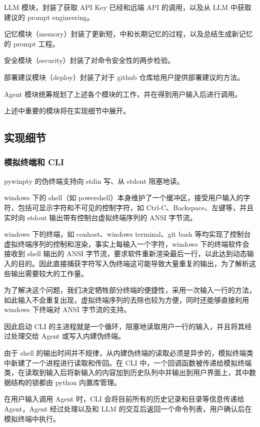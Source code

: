 \documentclass{article}
\theoremstyle{plain}
\theoremstyle{definition}
\theoremstyle{remark}
\begin{document}
LLM 模块，封装了获取 API Key 已经和远端 API 的调用，以及从 LLM 中获取建议的 prompt engineering。

记忆模块（memory）封装了更新短，中和长期记忆的过程，以及总结生成新记忆的 prompt 工程。

安全模块（security）封装了对命令安全性的两步检验。

部署建议模块（deploy）封装了对于 github 仓库给用户提供部署建议的方法。

Agent 模块统筹规划了上述各个模块的工作，并在得到用户输入后进行调用。

上述中重要的模块将在实现细节中展开。

\subsection{实现细节}

\subsubsection{模拟终端和 CLI}

pywinpty 的伪终端支持向 stdin 写、从 stdout 阻塞地读。

windows 下的 shell（如 powershell）本身维护了一个缓冲区，接受用户输入的字符，包括可显示字符和不可见的控制字符，如 Ctrl-C、Backspace、左键等，并且实时向 stdout 输出带有控制台虚拟终端序列的 ANSI 字节流。

windows 下的终端，如 conhost、windows terminal、git bash 等均实现了控制台虚拟终端序列的控制和渲染，事实上每输入一个字符，windows 下的终端软件会接收到 shell 输出的 ANSI 字节流，要求软件重新渲染最后一行，以此达到动态输入的目的。因此直接捕获字符写入伪终端这可能导致大量重复的输出，为了解析这些输出需要较大的工作量。

为了解决这个问题，我们决定牺牲部分终端的便捷性，采用一次输入一行的方法，如此输入不会重复出现，虚拟终端序列的去除也较为方便，同时还能够直接利用 windows 下终端对 ANSI 字节流的支持。

因此启动 CLI 的主进程就是一个循环，阻塞地读取用户一行的输入，并且将其经过处理交给 Agent 或写入内建伪终端。

由于 shell 的输出时间并不规律，从内建伪终端的读取必须是异步的，模拟终端类中新建了一个进程进行读取和传回。在 CLI 中，一个回调函数被传递给模拟终端类，在读取到输入后将新输入的内容加到历史队列中并输出到用户界面上，其中数据结构的锁都由 python 内置库管理。

在用户输入调用 Agent 时，CLI 会将目前所有的历史记录和目录等信息传递给 Agent，Agent 经过处理以及和 LLM 的交互后返回一个命令列表，用户确认后在模拟终端中执行。
\end{document}
